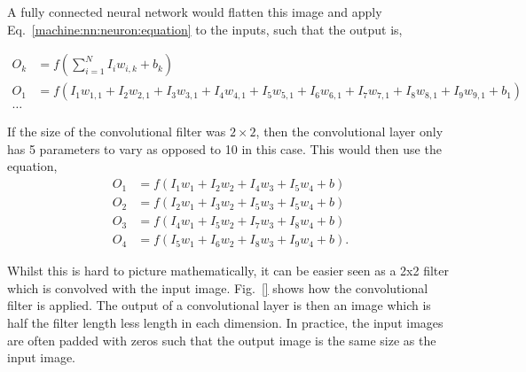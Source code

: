 A fully connected neural network would flatten this image and apply Eq.~\ref{machine:nn:neuron:equation} to the inputs, such that the output is,

\begin{equation}
\begin{split}
    O_{k} &= f\left(\sum^N_{i=1} I_i w_{i,k} + b_k \right) \\
    O_1 &= f\left(I_1 w_{1,1} + I_2 w_{2,1} + I_3 w_{3,1} + I_4 w_{4,1} + I_5 w_{5,1} + I_6 w_{6,1} + I_7 w_{7,1} + I_8 w_{8,1} + I_9 w_{9,1} + b_1\right) \\
     \dots
\end{split}
\end{equation}

If the size of the convolutional filter was $2\times 2$, then the convolutional layer only has 5 parameters to vary as opposed to 10 in this case.
This would then use the equation,
\begin{equation}
\begin{split}
    O_1 &= f\left(I_1 w_1 + I_2 w_2 + I_4 w_3 + I_5 w_4 + b\right) \\
    O_2 &=  f\left( I_2 w_1 + I_3 w_2 + I_5 w_3 + I_5 w_4 + b\right)\\
    O_3 &=  f\left(I_4 w_1 + I_5 w_2 + I_7 w_3 + I_8 w_4 + b\right)\\
    O_4 &=  f\left(I_5 w_1 + I_6 w_2 + I_8 w_3 + I_9 w_4 + b\right).
\end{split}
\end{equation}

Whilst this is hard to picture mathematically, it can be easier seen as a 2x2 filter which is convolved with the input image. 
Fig.~\ref{} shows how the convolutional filter is applied.
The output of a convolutional layer is then an image which is half the filter length less length in each dimension. 
In practice, the input images are often padded with zeros such that the output image is the same size as the input image. 

